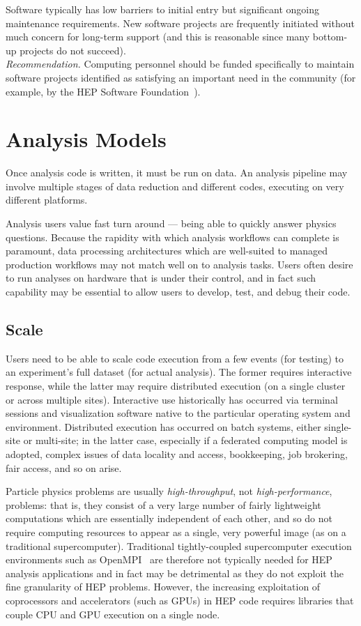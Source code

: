 Software typically has low barriers to initial entry but significant ongoing maintenance requirements. New software projects are frequently initiated without much concern for long-term support (and this is reasonable since many bottom-up projects do not succeed).\\
\textit{Recommendation.} Computing personnel should be funded specifically to maintain software projects identified as satisfying an important need in the community (for example, by the HEP Software Foundation~\cite{HSF}). 


\section{Analysis Models}
Once analysis code is written, it must be run on data. An analysis pipeline may involve multiple stages of data reduction and different codes, executing on very different platforms.

Analysis users value fast turn around --- being able to quickly answer physics questions. Because the rapidity with which analysis workflows can complete is paramount, data processing architectures which are well-suited to managed production workflows may not match well on to analysis tasks. Users often desire to run analyses on hardware that is under their control, and in fact such capability may be essential to allow users to develop, test, and debug their code. 

\subsection{Scale}
Users need to be able to scale code execution from a few events (for testing) to an experiment's full dataset (for actual analysis). The former requires interactive response, while the latter may require distributed execution (on a single cluster or across multiple sites). Interactive use historically has occurred via terminal sessions and visualization software native to the particular operating system and environment. Distributed execution has occurred on batch systems, either single-site or multi-site; in the latter case, especially if a federated computing model is adopted, complex issues of data locality and access, bookkeeping, job brokering, fair access, and so on arise.

Particle physics problems are usually \textit{high-throughput}, not \textit{high-performance}, problems: that is, they consist of a very large number of fairly lightweight computations which are essentially independent of each other, and so do not require computing resources to appear as a single, very powerful image (as on a traditional supercomputer). Traditional tightly-coupled supercomputer execution environments such as OpenMPI~\cite{gabriel04:_open_mpi} are therefore not typically needed for HEP analysis applications and in fact may be detrimental as they do not exploit the fine granularity of HEP problems. However, the increasing exploitation of coprocessors and accelerators (such as GPUs) in HEP code requires libraries that couple CPU and GPU execution on a single node.

